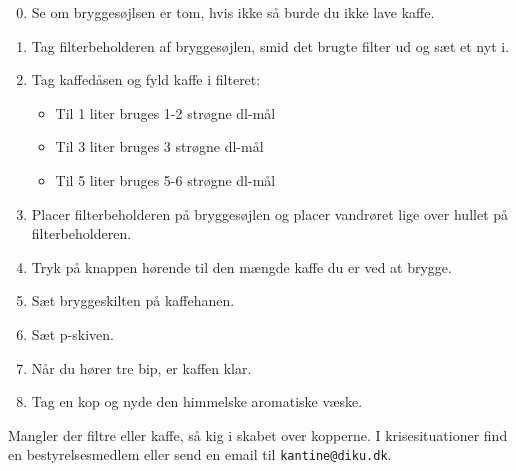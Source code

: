 \documentclass{article}
\begin{document}

\maketitle

\LARGE
\begin{enumerate}

\setcounter{enumi}{-1}

\itemsep0em

\item Se om bryggesøjlsen er tom, hvis ikke så burde du ikke lave kaffe.

\item Tag filterbeholderen af bryggesøjlen, smid det brugte filter ud og sæt et
nyt i.

\item Tag kaffedåsen og fyld kaffe i filteret:

\begin{itemize}

\bfseries

\item Til 1 liter bruges 1-2 strøgne dl-mål

\item Til 3 liter bruges 3 strøgne dl-mål

\item Til 5 liter bruges 5-6 strøgne dl-mål


\end{itemize} \normalfont

\item Placer filterbeholderen på bryggesøjlen og placer vandrøret lige over
hullet på filterbeholderen.

\item Tryk på knappen hørende til den mængde kaffe du er ved at brygge.

\item Sæt bryggeskilten på kaffehanen.

\item Sæt p-skiven.

\item Når du hører tre bip, er kaffen klar.

\item Tag en kop og nyde den himmelske aromatiske væske.

\end{enumerate}

\Large

Mangler der filtre eller kaffe, så kig i skabet over kopperne. I
krisesituationer find en bestyrelsesmedlem eller send en email til
\texttt{kantine@diku.dk}.

\underskriv
\end{document}
